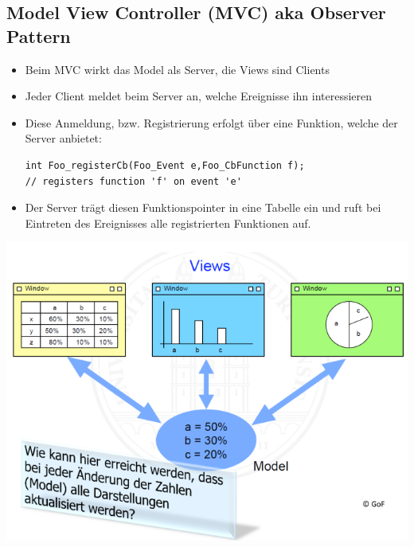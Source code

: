 \subsection{Model View Controller (MVC) aka Observer Pattern}
\begin{multicols}{2}	
	\begin{itemize}
		\item Beim MVC wirkt das Model als Server, die Views sind Clients
		\item Jeder Client meldet beim Server an, welche Ereignisse ihn interessieren
		\item Diese Anmeldung, bzw. Registrierung erfolgt über eine Funktion, welche der Server anbietet:
		\begin{lstlisting}[style=C]
int Foo_registerCb(Foo_Event e,Foo_CbFunction f);
// registers function 'f' on event 'e'
		\end{lstlisting}
		\item Der Server trägt diesen Funktionspointer in eine Tabelle ein und ruft bei Eintreten des Ereignisses alle registrierten Funktionen auf.
	\end{itemize}
\columnbreak
	\includegraphics[scale = 0.65]{images/EventBasedSystems/MVC}  
\end{multicols}
